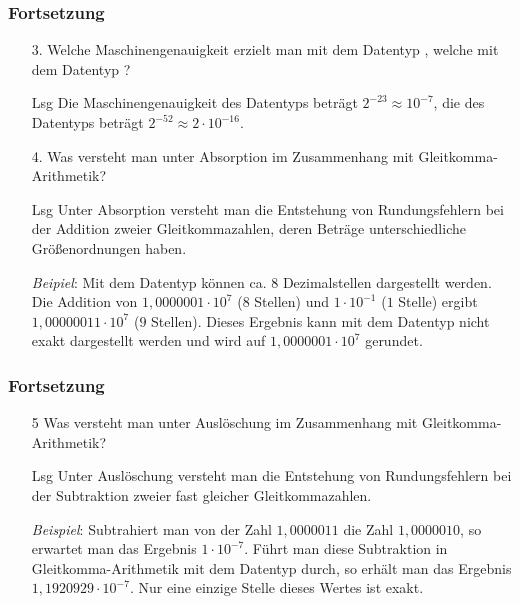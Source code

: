 \begin{frame}[t]%
  \frametitle{Fortsetzung}%
\centering
\medskip

\begin{enumerate}
\item[3.]
Welche Maschinengenauigkeit erzielt man mit dem Datentyp , welche mit dem Datentyp ?

\item[Lsg]
Die Maschinengenauigkeit des Datentyps  beträgt $2^{-23} \approx 10^{-7}$, die des Datentyps  beträgt $2^{-52} \approx 2 \cdot 10^{-16}$.

\item[4.]
Was versteht man unter Absorption im Zusammenhang mit Gleitkomma-Arithmetik?

\item[Lsg]
Unter Absorption versteht man die Entstehung von Rundungsfehlern bei der Addition zweier Gleitkommazahlen, deren Beträge unterschiedliche Größenordnungen haben.

\emph{Beipiel}: Mit dem Datentyp  können ca{.} $8$ Dezimalstellen dargestellt werden.
Die Addition von $1{,}0000001 \cdot 10^7$ ($8$ Stellen) und $1 \cdot 10^{-1}$ ($1$ Stelle) ergibt $1{,}00000011 \cdot 10^7$ ($9$ Stellen).
Dieses Ergebnis kann mit dem Datentyp  nicht exakt dargestellt werden und wird auf $1{,}0000001 \cdot 10^7$ gerundet.
\end{enumerate}
\end{frame}

\begin{frame}[t]%
  \frametitle{Fortsetzung}%
\centering
\medskip

\begin{enumerate}
\item[5]
Was versteht man unter Auslöschung im Zusammenhang mit Gleitkomma-Arithmetik?

\item[Lsg]
Unter Auslöschung versteht man die Entstehung von Rundungsfehlern bei der Subtraktion zweier fast gleicher Gleitkommazahlen.

\emph{Beispiel}: Subtrahiert man von der Zahl $1{,}0000011$ die Zahl $1{,}0000010$, so erwartet man das Ergebnis $1 \cdot 10^{-7}$.
Führt man diese Subtraktion in Gleitkomma-Arithmetik mit dem Datentyp  durch, so erhält man das Ergebnis $1{,}1920929 \cdot 10^{-7}$.
Nur eine einzige Stelle dieses Wertes ist exakt.
\end{enumerate}

\end{frame}
